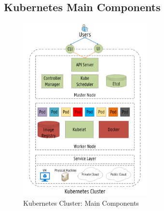 \subsection{Kubernetes Main Components}
\label{sec:k8s_main_comp}

\begin{figure}
  \centering
  \includegraphics[width=68mm]{figures/mlcn-k8s-components.pdf}
  \caption{Kubernetes Cluster: Main Components\cite{Santos2019}}
  \label{fig:k8s-comp}
\end{figure}

